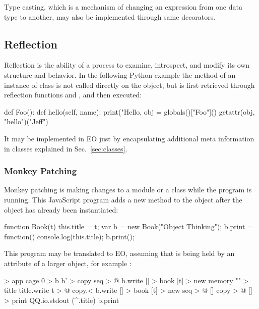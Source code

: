 \documentclass[sigplan,11pt,nonacm,natbib=false]{acmart}
\begin{document}
Type casting, which is a mechanism of changing an expression from one data type to another, may also be implemented through same decorators.

\subsection{Reflection}
\label{sec:reflection}

Reflection is the ability of a process to examine, introspect, and modify its own structure and behavior. In the following Python example the method  of an instance of class  is not called directly on the object, but is first retrieved through reflection functions  and , and then executed:

\begin{ffcode}
def Foo():
    def hello(self, name):
        print("Hello, %
obj = globals()["Foo"]()
getattr(obj, "hello")("Jeff")
\end{ffcode}

It may be implemented in EO just by encapsulating additional meta information in classes explained in Sec.~\ref{sec:classes}.

\subsubsection{Monkey Patching}

Monkey patching is making changes to a module or a class while the program is running. This JavaScript program adds a new method  to the object  after the object has already been instantiated:

\begin{ffcode}
function Book(t) { this.title = t; }
var b = new Book("Object Thinking");
b.print = function() {
  console.log(this.title);
}
b.print();
\end{ffcode}

This program may be translated to EO, assuming that  is being held by an attribute of a larger object, for example :

\begin{ffcode}
[] > app
  cage 0 > b
  b' > copy
  seq > @
    b.write
      [] > book
        [t] > new
          memory "" > title
          title.write t > @
    copy.<
    b.write
      [] > book
        [t] > new
          seq > @
            []
              copy > @
              [] > print
                QQ.io.stdout (^.title)
    b.print
\end{ffcode}
\end{document}

